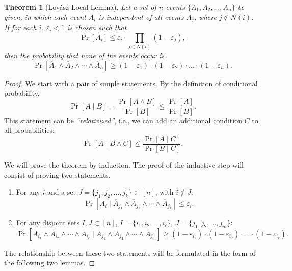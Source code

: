 \documentclass[12pt,sans]{article}
\newcommand{\seqn}[2]{{#1}_1,{#1}_2,\dotsc,{#1}_{#2}}
\theoremstyle{definition}
\theoremstyle{plain}
\newtheorem{theorem}{Theorem}[section]
\theoremstyle{remark}
\begin{document}
\begin{theorem}[Lovász Local Lemma] Let a set of $n$ events $\{\seqn{A}{n}\}$ be given, in which each event $A_i$ is independent of all events $A_j$, where $j \not\in N(i)$. If for each $i$, $\varepsilon_i < 1$ is chosen such that
    \[
    \Pr[A_i] \le \varepsilon_i \cdot \prod_{j \in N(i)} (1 - \varepsilon_j),
    \]
    then the probability that none of the events occur is
    \[
    \Pr[\overline{A}_1\land\overline{A}_2\land\dotsb\land\overline{A}_n]
    \ge (1 - \varepsilon_1)\cdot(1 - \varepsilon_2) \cdot\dotso\cdot (1 - \varepsilon_n).
    \]
\end{theorem}
\begin{proof}
    We start with a pair of simple statements. By the definition of conditional probability,
    \[
    \Pr[A \mid B] = \frac{\Pr[A \land B]}{\Pr[B]} \le \frac{\Pr[A]}{\Pr[B]}.
    \]
    This statement can be \emph{“relativized”}, i.e., we can add an additional condition $C$ to all probabilities:
    \begin{equation}\label{eq:lll:fact}
        \Pr[A \mid B \land C] \le \frac{\Pr[A \mid C]}{\Pr[B \mid C]}.
    \end{equation}

    We will prove the theorem by induction. The proof of the inductive step will consist of proving two statements.
    \begin{enumerate}
        \item For any $i$ and a set $J = \{\seqn{j}{k}\} \subset [n]$, with $i \not\in J$:
        \begin{equation}\label{eq:lll:ind1}
            \Pr[A_i \mid \overline A_{j_1} \land \overline A_{j_2} \land \dotsb \land \overline A_{j_k}] \le \varepsilon_i.
        \end{equation}
        \item For any disjoint sets $I, J \subset [n]$, $I = \{\seqn{i}{\ell}\}$, $J = \{\seqn{j}{m}\}$:
        \begin{equation}\label{eq:lll:ind2}
            \Pr[\overline A_{i_1} \land \overline A_{i_2} \land \dotsb \land \overline A_{i_\ell} \mid
            \overline A_{j_1} \land \overline A_{j_2} \land \dotsb \land \overline A_{j_m}] \ge
            (1 - \varepsilon_{i_1}) \cdot (1 - \varepsilon_{i_2}) \cdot \dotso \cdot (1 - \varepsilon_{i_\ell}).
        \end{equation}
    \end{enumerate}
    The relationship between these two statements will be formulated in the form of the following two lemmas.


\end{proof}
\end{document}
